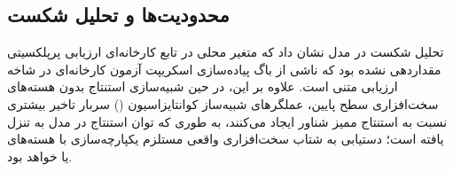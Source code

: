 \subsection{محدودیت‌ها و تحلیل شکست}
تحلیل شکست در مدل  نشان داد که متغیر محلی در تابع کارخانه‌ای ارزیابی پرپلکسیتی مقداردهی نشده بود که ناشی از باگ پیاده‌سازی اسکریپت آزمون کارخانه‌ای در شاخه ارزیابی متنی است. علاوه بر این، در حین شبیه‌سازی استنتاج بدون هسته‌های سخت‌افزاری سطح پایین، عملگرهای شبیه‌ساز کوانتایزاسیون () سربار تاخیر بیشتری نسبت به استنتاج ممیز شناور ایجاد می‌کنند، به طوری که توان استنتاج در مدل  به  تنزل یافته است؛ دستیابی به شتاب سخت‌افزاری واقعی مستلزم یکپارچه‌سازی با هسته‌های  یا  خواهد بود.
